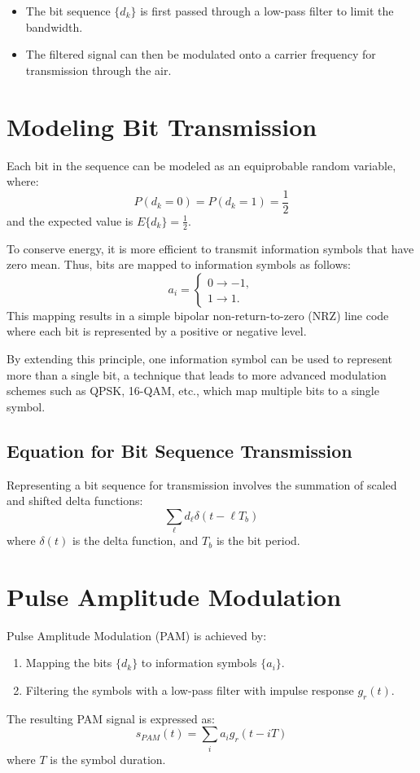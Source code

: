 \begin{itemize}
    \item The bit sequence \( \{d_k\} \) is first passed through a low-pass filter to limit the bandwidth.
    \item The filtered signal can then be modulated onto a carrier frequency for transmission through the air.
\end{itemize}

\section*{Modeling Bit Transmission}

Each bit in the sequence can be modeled as an equiprobable random variable, where:
\[
P(d_k = 0) = P(d_k = 1) = \frac{1}{2}
\]
and the expected value is \( E\{d_k\} = \frac{1}{2} \).

To conserve energy, it is more efficient to transmit information symbols that have zero mean. Thus, bits are mapped to information symbols as follows:
\[
a_i =
\begin{cases}
  0 \rightarrow -1,\\
  1 \rightarrow 1.
\end{cases}
\]
This mapping results in a simple bipolar non-return-to-zero (NRZ) line code where each bit is represented by a positive or negative level.

By extending this principle, one information symbol can be used to represent more than a single bit, a technique that leads to more advanced modulation schemes such as QPSK, 16-QAM, etc., which map multiple bits to a single symbol.

\subsection*{Equation for Bit Sequence Transmission}
Representing a bit sequence for transmission involves the summation of scaled and shifted delta functions:
\[
\sum_{\ell} d_{\ell}\delta(t - \ell T_b)
\]
where \( \delta(t) \) is the delta function, and \( T_b \) is the bit period.


\section*{Pulse Amplitude Modulation}

Pulse Amplitude Modulation (PAM) is achieved by:
\begin{enumerate}
    \item Mapping the bits \( \{d_k\} \) to information symbols \( \{a_i\} \).
    \item Filtering the symbols with a low-pass filter with impulse response \( g_r(t) \).
\end{enumerate}
The resulting PAM signal is expressed as:
\[ s_{PAM}(t) = \sum_i a_i g_r(t - iT) \]
where \( T \) is the symbol duration.

